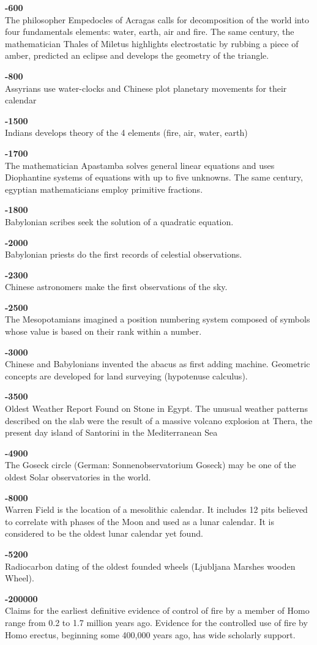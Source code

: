 \textbf{-600}\\
The philosopher Empedocles of Acragas calls for decomposition of the world into four fundamentals elements: water, earth, air and fire. The same century, the mathematician Thales of Miletus highlights electrostatic by rubbing a piece of amber, predicted an eclipse and develops the geometry of the triangle.

\textbf{-800}\\
Assyrians use water-clocks and Chinese plot planetary movements for their calendar

\textbf{-1500}\\
Indians develops theory of the 4 elements (fire, air, water, earth)

\textbf{-1700}\\
The mathematician Apastamba solves general linear equations and uses Diophantine systems of equations with up to five unknowns. The same century, egyptian mathematicians employ primitive fractions.

\textbf{-1800}\\
Babylonian scribes seek the solution of a quadratic equation.

\textbf{-2000}\\
Babylonian priests do the first records of celestial observations.

\textbf{-2300}\\
Chinese astronomers make the first observations of the sky.

\textbf{-2500}\\
The Mesopotamians imagined a position numbering system composed of symbols whose value is based on their rank within a number.

\textbf{-3000}\\
Chinese and Babylonians invented the abacus as first adding machine. Geometric concepts are developed for land surveying (hypotenuse calculus).

\textbf{-3500}\\
Oldest Weather Report Found on Stone in Egypt. The unusual weather patterns described on the slab were the result of a massive volcano explosion at Thera, the present day island of Santorini in the Mediterranean Sea

\textbf{-4900}\\
The Goseck circle (German: Sonnenobservatorium Goseck) may be one of the oldest Solar observatories in the world.

\textbf{-8000}\\
Warren Field is the location of a mesolithic calendar. It includes 12 pits believed to correlate with phases of the Moon and used as a lunar calendar. It is considered to be the oldest lunar calendar yet found.

\textbf{-5200}\\
Radiocarbon dating of the oldest founded wheels (Ljubljana Marshes wooden Wheel).	

\textbf{-200000}\\
Claims for the earliest definitive evidence of control of fire by a member of Homo range from 0.2 to 1.7 million years ago. Evidence for the controlled use of fire by Homo erectus, beginning some 400,000 years ago, has wide scholarly support.